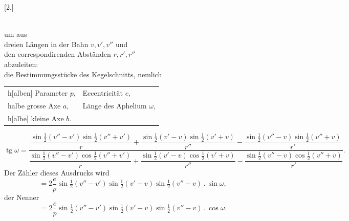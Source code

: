 \clearpage
\begingroup
{}
\HistoricalFoot{}{30\textsuperscript{*}}
\begin{center}
[2.]
\end{center}
\noindent{\small [S. 9]}
\begin{center}
\\
um aus\\
dreien Längen in der Bahn $v,v',v''$ und\\
den correspondirenden Abständen $r,r',r''$\\
abzuleiten:\\
die Bestimmungsstücke des Kegelschnitts, nemlich\\
\begin{tabular}{ll}
h[alben] Parameter $p$,&Eccentricität $e$,\\
halbe grosse Axe $a$,&Länge des Aphelium $\omega$,\\
h[albe] kleine Axe $b$.&
\end{tabular}
\end{center}
{\small
\[
\operatorname{tg}\omega=
\frac{\dfrac{\sin\frac12(v''-v')\sin\frac12(v''+v')}{r}
+\dfrac{\sin\frac12(v'-v)\sin\frac12(v'+v)}{r''}
-\dfrac{\sin\frac12(v''-v)\sin\frac12(v''+v)}{r'}}
{\dfrac{\sin\frac12(v''-v')\cos\frac12(v''+v')}{r}
+\dfrac{\sin\frac12(v'-v)\cos\frac12(v'+v)}{r''}
-\dfrac{\sin\frac12(v''-v)\cos\frac12(v''+v)}{r'}}.
\]}
\noindent Der Zähler dieses Ausdrucks wird
\[
=2\frac ep\sin\tfrac12(v''-v')\sin\tfrac12(v'-v)\sin\tfrac12(v''-v)\mathbin{.}\sin\omega,
\]
\noindent der Nenner
\[
=2\frac ep\sin\tfrac12(v''-v')\sin\tfrac12(v'-v)\sin\tfrac12(v''-v)\mathbin{.}\cos\omega.
\]

